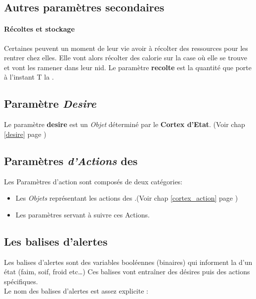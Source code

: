 \documentclass[french]{report}
\begin{document}
\subsection{Autres paramètres secondaires}\label{param_second}

\paragraph{\textbf{Récoltes et stockage}}
Certaines \CoCiX peuvent un moment de leur vie avoir à récolter des ressources pour les rentrer chez elles.
Elle vont alors récolter des calorie sur la case où elle se trouve et vont les ramener dans leur nid. Le paramètre \textbf{recolte} est la quantité que porte à l'instant T la \CoCiX.

\subsection{Paramètre \textit{Desire}}
Le paramètre \textbf{desire} est un \textit{Objet} déterminé par le \textbf{Cortex d'Etat}. (Voir chap \ref{desire} page \pageref{desire})

\newpage

\subsection{Paramètres \textit{d'Actions} des  \CoCiX}\label{param_action}
Les Paramètres d'action sont composés de deux catégories:
\begin{itemize}
	\item Les \textit{Objets} représentant les actions des \CoCiX.(Voir chap \ref{cortex_action} page \pageref{cortex_action})\\
	\item Les paramètres servant à suivre ces Actions.
\end{itemize}


\subsection{Les balises d'alertes}\label{balise}
Les balises d'alertes sont des variables booléennes (binaires) qui informent la \CoCiX d'un état (faim, soif, froid etc\dots) Ces balises vont entraîner des désires puis des actions spécifiques.\\

Le nom des balises d'alertes est assez explicite : 
\end{document}

